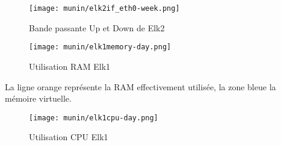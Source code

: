 \begin{figure}[H]
\center
\texttt{[image: munin/elk2if\_eth0-week.png]}
\label{fig:elk2eth0}
\caption{Bande passante Up et Down de Elk2}
\end{figure}
\begin{figure}[H]
\center
\texttt{[image: munin/elk1memory-day.png]}
\label{fig:elk1memory}
\caption{Utilisation RAM Elk1}
\end{figure}
La ligne orange représente la RAM effectivement utilisée, la zone bleue la mémoire virtuelle.
\begin{figure}[H]
\center
\texttt{[image: munin/elk1cpu-day.png]}
\label{fig:elk1cpu}
\caption{Utilisation CPU Elk1}
\end{figure}
